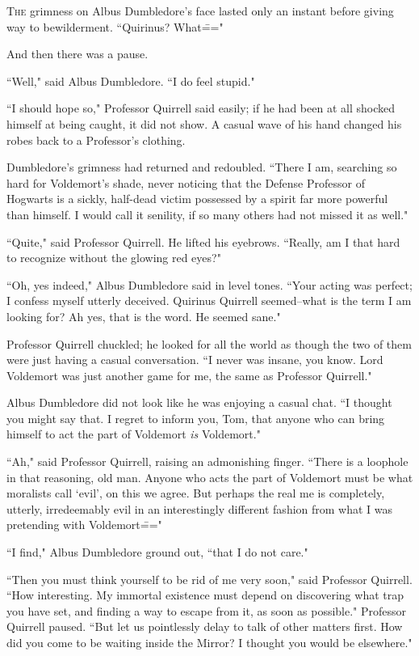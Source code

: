 
\lettrine{T}{he} grimness on Albus Dumbledore's face lasted only an instant before giving way to bewilderment. ``Quirinus? What\==="

And then there was a pause.

``Well," said Albus Dumbledore. ``I do feel stupid."

``I should hope so," Professor Quirrell said easily; if he had been at all shocked himself at being caught, it did not show. A casual wave of his hand changed his robes back to a Professor's clothing.

Dumbledore's grimness had returned and redoubled. ``There I am, searching so hard for Voldemort's shade, never noticing that the Defense Professor of Hogwarts is a sickly, half-dead victim possessed by a spirit far more powerful than himself. I would call it senility, if so many others had not missed it as well."

``Quite," said Professor Quirrell. He lifted his eyebrows. ``Really, am I that hard to recognize without the glowing red eyes?"

``Oh, yes indeed," Albus Dumbledore said in level tones. ``Your acting was perfect; I confess myself utterly deceived. Quirinus Quirrell seemed\---what is the term I am looking for? Ah yes, that is the word. He seemed sane."

Professor Quirrell chuckled; he looked for all the world as though the two of them were just having a casual conversation. ``I never was insane, you know. Lord Voldemort was just another game for me, the same as Professor Quirrell."

Albus Dumbledore did not look like he was enjoying a casual chat. ``I thought you might say that. I regret to inform you, Tom, that anyone who can bring himself to act the part of Voldemort \emph{is} Voldemort."

``Ah," said Professor Quirrell, raising an admonishing finger. ``There is a loophole in that reasoning, old man. Anyone who acts the part of Voldemort must be what moralists call `evil', on this we agree. But perhaps the real me is completely, utterly, irredeemably evil in an interestingly different fashion from what I was pretending with Voldemort\==="

``I find," Albus Dumbledore ground out, ``that I do not care."

``Then you must think yourself to be rid of me very soon," said Professor Quirrell. ``How interesting. My immortal existence must depend on discovering what trap you have set, and finding a way to escape from it, as soon as possible." Professor Quirrell paused. ``But let us pointlessly delay to talk of other matters first. How did you come to be waiting inside the Mirror? I thought you would be elsewhere."

